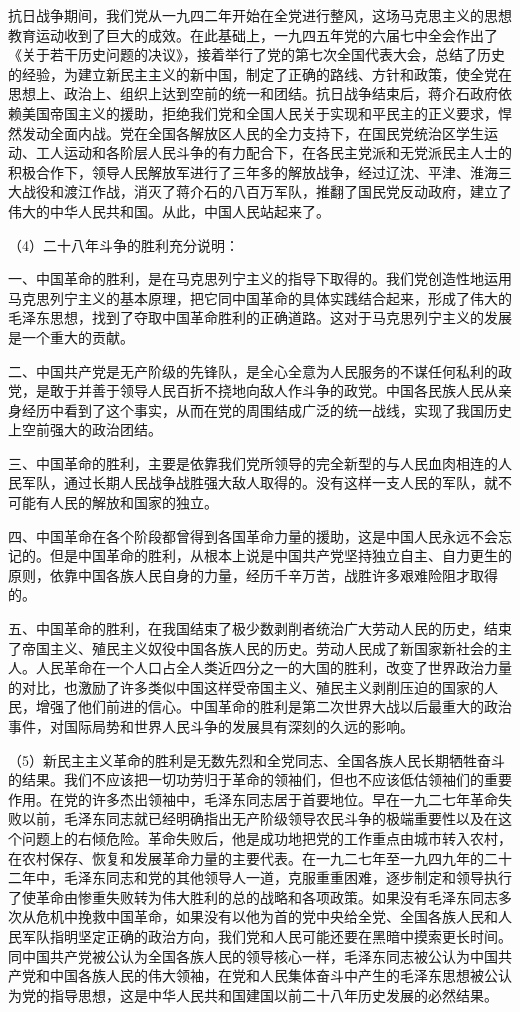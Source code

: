 抗日战争期间，我们党从一九四二年开始在全党进行整风，这场马克思主义的思想教育运动收到了巨大的成效。在此基础上，一九四五年党的六届七中全会作出了《关于若干历史问题的决议》，接着举行了党的第七次全国代表大会，总结了历史的经验，为建立新民主主义的新中国，制定了正确的路线、方针和政策，使全党在思想上、政治上、组织上达到空前的统一和团结。抗日战争结束后，蒋介石政府依赖美国帝国主义的援助，拒绝我们党和全国人民关于实现和平民主的正义要求，悍然发动全面内战。党在全国各解放区人民的全力支持下，在国民党统治区学生运动、工人运动和各阶层人民斗争的有力配合下，在各民主党派和无党派民主人士的积极合作下，领导人民解放军进行了三年多的解放战争，经过辽沈、平津、淮海三大战役和渡江作战，消灭了蒋介石的八百万军队，推翻了国民党反动政府，建立了伟大的中华人民共和国。从此，中国人民站起来了。

（4）二十八年斗争的胜利充分说明：

一、中国革命的胜利，是在马克思列宁主义的指导下取得的。我们党创造性地运用马克思列宁主义的基本原理，把它同中国革命的具体实践结合起来，形成了伟大的毛泽东思想，找到了夺取中国革命胜利的正确道路。这对于马克思列宁主义的发展是一个重大的贡献。

二、中国共产党是无产阶级的先锋队，是全心全意为人民服务的不谋任何私利的政党，是敢于并善于领导人民百折不挠地向敌人作斗争的政党。中国各民族人民从亲身经历中看到了这个事实，从而在党的周围结成广泛的统一战线，实现了我国历史上空前强大的政治团结。

三、中国革命的胜利，主要是依靠我们党所领导的完全新型的与人民血肉相连的人民军队，通过长期人民战争战胜强大敌人取得的。没有这样一支人民的军队，就不可能有人民的解放和国家的独立。

四、中国革命在各个阶段都曾得到各国革命力量的援助，这是中国人民永远不会忘记的。但是中国革命的胜利，从根本上说是中国共产党坚持独立自主、自力更生的原则，依靠中国各族人民自身的力量，经历千辛万苦，战胜许多艰难险阻才取得的。

五、中国革命的胜利，在我国结束了极少数剥削者统治广大劳动人民的历史，结束了帝国主义、殖民主义奴役中国各族人民的历史。劳动人民成了新国家新社会的主人。人民革命在一个人口占全人类近四分之一的大国的胜利，改变了世界政治力量的对比，也激励了许多类似中国这样受帝国主义、殖民主义剥削压迫的国家的人民，增强了他们前进的信心。中国革命的胜利是第二次世界大战以后最重大的政治事件，对国际局势和世界人民斗争的发展具有深刻的久远的影响。

（5）新民主主义革命的胜利是无数先烈和全党同志、全国各族人民长期牺牲奋斗的结果。我们不应该把一切功劳归于革命的领袖们，但也不应该低估领袖们的重要作用。在党的许多杰出领袖中，毛泽东同志居于首要地位。早在一九二七年革命失败以前，毛泽东同志就已经明确指出无产阶级领导农民斗争的极端重要性以及在这个问题上的右倾危险。革命失败后，他是成功地把党的工作重点由城市转入农村，在农村保存、恢复和发展革命力量的主要代表。在一九二七年至一九四九年的二十二年中，毛泽东同志和党的其他领导人一道，克服重重困难，逐步制定和领导执行了使革命由惨重失败转为伟大胜利的总的战略和各项政策。如果没有毛泽东同志多次从危机中挽救中国革命，如果没有以他为首的党中央给全党、全国各族人民和人民军队指明坚定正确的政治方向，我们党和人民可能还要在黑暗中摸索更长时间。同中国共产党被公认为全国各族人民的领导核心一样，毛泽东同志被公认为中国共产党和中国各族人民的伟大领袖，在党和人民集体奋斗中产生的毛泽东思想被公认为党的指导思想，这是中华人民共和国建国以前二十八年历史发展的必然结果。

